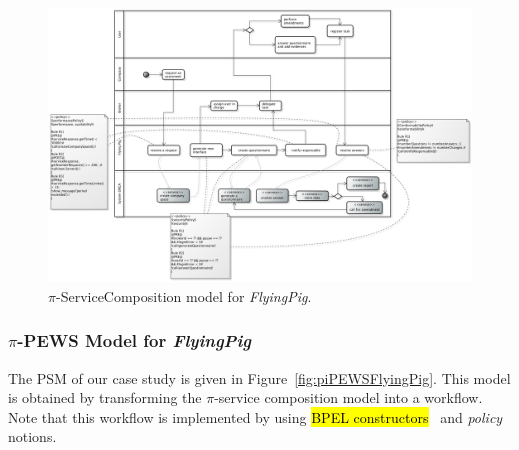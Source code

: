 \documentclass{singlecol-new}
\theoremstyle{TH}{
\newtheorem{lemma}{Lemma}
\newtheorem{theorem}[lemma]{Theorem}
\newtheorem{corrolary}[lemma]{Corrolary}
\newtheorem{conjecture}[lemma]{Conjecture}
\newtheorem{proposition}[lemma]{Proposition}
\newtheorem{claim}[lemma]{Claim}
\newtheorem{stheorem}[lemma]{Wrong Theorem}
\newtheorem{algorithm}{Algorithm}
}
\theoremstyle{THrm}{
\newtheorem{definition}{Definition}[section]
\newtheorem{question}{Question}[section]
\newtheorem{remark}{Remark}
\newtheorem{scheme}{Scheme}
}
\theoremstyle{THhit}{
\newtheorem{case}{Case}[section]
}
\theoremstyle{THhsl}{
\newtheorem{example}{Example}
}
\def\FlyingPig{\textsl{FlyingPig}\xspace}
\begin{document}
\begin{figure}[h]
\centering
\includegraphics[width=1.0\textwidth]{./figures/ServiceCompositionGeneralCut}
\caption{$\pi$-ServiceComposition model for \FlyingPig.\label{fig:PiServiceCompositionModel}}
\end{figure}


\subsubsection{$\pi$-PEWS Model for \FlyingPig}

The  PSM of our case study is given in Figure~\ref{fig:piPEWSFlyingPig}. This model is obtained by transforming the $\pi$-service composition model into a workflow.
Note that this workflow is implemented by using  \hl{BPEL constructors}~\cite{ws-bpel2} and \textit{policy} notions.
\end{document}
